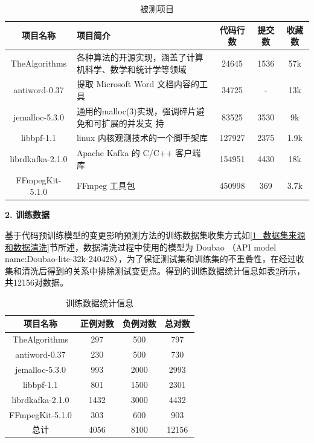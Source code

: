 \begin{table}[htbp]
\caption{被测项目}
\label{1_data_from}
\vspace{0.5em}\centering\wuhao
\begin{tabular}{cp{6cm}ccc}
\toprule
项目名称 & 项目简介 & 代码行数& 提交数 & 收藏数 \\
\midrule
TheAlgorithms & 各种算法的开源实现，涵盖了计算机科学、数学和统计学等领域 & 24645 & 1536 & 57k \\
antiword-0.37 & 提取 Microsoft Word 文档内容的工具 & 34725& - & 13k\\
jemalloc-5.3.0 & 通用的malloc(3)实现，强调碎片避免和可扩展的并发支
持  &83525& 3530 & 9k \\
libbpf-1.1 & linux 内核观测技术的一个脚手架库 & 127927 & 2375 & 1.9k \\
librdkafka-2.1.0& Apache Kafka 的 C/C++ 客户端库 & 154951 & 4430 & 18k \\
FFmpegKit-5.1.0 & FFmpeg 工具包 & 450998 & 369 & 3.7k \\

\bottomrule
\end{tabular}
\end{table}

\noindent \textbf{2. 训练数据}

基于代码预训练模型的变更影响预测方法的训练数据集收集方式如\ref{1_数据集来源和数据清洗}节所述，数据清洗过程中使用的模型为 Doubao （API model name:Doubao-lite-32k-240428），为了保证测试集和训练集的不重叠性，在经过收集和清洗后得到的关系中排除测试变更点。得到的训练数据统计信息如表\ref{1_数据集统计信息}所示，共12156对数据。

\begin{table}[htbp]
\caption{训练数据统计信息}
\label{1_数据集统计信息}
\vspace{0.5em}\centering\wuhao
\begin{tabular}{cccc}
\toprule
项目名称 & 正例对数 & 负例对数 & 总对数 \\
\midrule
TheAlgorithms    & 297 & 500 & 797 \\
antiword-0.37    & 230 & 500  & 730 \\
jemalloc-5.3.0   & 993 & 2000 & 2993 \\
libbpf-1.1       & 801 & 1500 & 2301 \\
librdkafka-2.1.0 & 1432  & 3000 & 4432 \\
FFmpegKit-5.1.0  & 303 & 600 & 903 \\ 
总计              & 4056 & 8100 & 12156 \\
\bottomrule
\end{tabular}
\end{table}



